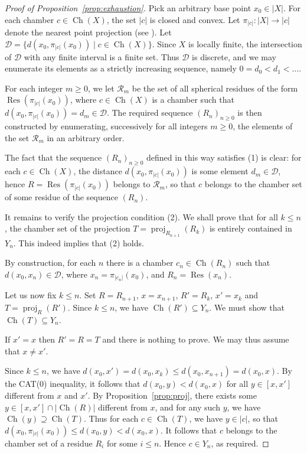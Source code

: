 \documentclass[12pt,a4paper]{amsproc}
\theoremstyle{definition}
\DeclareMathOperator{\Ch}{Ch}
\DeclareMathOperator{\proj}{proj}
\DeclareMathOperator{\Res}{Res}
\begin{document}
\begin{proof}[Proof of Proposition~\ref{prop:exhaustion}]
Pick an arbitrary base point $x_0 \in |X|$. For each chamber $c \in \Ch(X)$, the set $|c|$ is closed and convex. Let $\pi_{|c|} \colon |X| \to |c|$ denote the nearest point projection (see \cite[\S II.2]{BH99}). Let $\mathcal D  = \{d(x_0, \pi_{|c|}(x_0)) \mid c \in \Ch(X)\}$. Since $X$ is locally finite, the intersection of $\mathcal D$ with any finite interval is a finite set. Thus $\mathcal D$ is discrete, and we may enumerate its elements as a strictly increasing sequence, namely $0 = d_0 < d_1<\dots$.  

For each integer $m\geq 0$, we let $\mathcal R_m$ be the set of all spherical residues of the form $\Res(\pi_{|c|}(x_0))$, where $c \in \Ch(X)$ is a chamber such that $d(x_0, \pi_{|c|}(x_0)) = d_m \in \mathcal D$. The required sequence $(R_n)_{n \geq 0}$ is then constructed  by enumerating, successively for all integers $m \geq 0$, the elements of the set $\mathcal R_m$ in an arbitrary order. 

The fact that the sequence $(R_n)_{n \geq 0}$ defined in this way satisfies (1) is clear: for each $c \in \Ch(X)$, the distance $d(x_0, \pi_{|c|}(x_0)) $ is some element $d_m \in \mathcal D$, hence $R = \Res(\pi_{|c|}(x_0))$ belongs to $\mathcal R_m$, so that $c$ belongs to the chamber set of some residue of the sequence $(R_n)$.

It remains to verify the projection condition (2). We shall prove that for all $k \leq n$, the chamber set of the projection $T= \proj_{R_{n+1}}(R_k)$ is entirely contained in $Y_n$. This indeed implies that (2) holds. 

By construction, for each $n$ there is a chamber $c_n \in \Ch(R_n)$ such that $d(x_0, x_n) \in \mathcal D$, where $x_n =  \pi_{|c_{n}|}(x_0)$, and $R_n = \Res(x_n)$. 

Let us now fix $k \leq n$. Set $R = R_{n+1}$, $x=x_{n+1}$, $R' = R_k$, $x'=x_k$ and   $T= \proj_{R}(R')$. Since $k \leq n$, we have $\Ch(R') \subseteq Y_n$. We must show that $\Ch(T) \subseteq Y_n$. 

If $x' = x$ then $R' = R = T$ and there is nothing to prove. We may thus assume that $x \neq x'$. 

Since $k \leq n$, we have $d(x_0, x') = d(x_0, x_k) \leq d(x_0, x_{n+1})=d(x_0, x)$. By the CAT(0) inequality, it follows that $d(x_0, y) < d(x_0, x)$ for all $y \in [x, x']$ different from $x$ and $x'$. By Proposition~\ref{prop:proj}, there exists some $y \in [x, x'] \cap |\Ch(R)|$ different from $x$, and for any such $y$, we have $\Ch(y) \supseteq \Ch(T)$. Thus for each $c \in \Ch(T)$, we have $y \in |c|$, so that $d(x_0, \pi_{|c|}(x_0))\leq d(x_0, y) < d(x_0, x)$. It follows that $c$ belongs to the chamber set of a residue $R_i$ for some $i \leq n$. Hence $c \in Y_n$, as required.
\end{proof}
\end{document}
